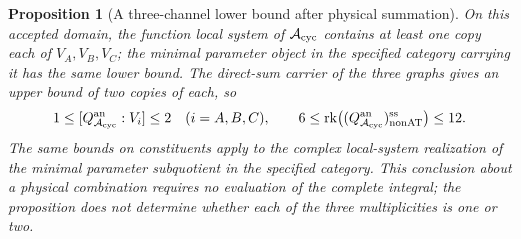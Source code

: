 \documentclass[11pt,a4paper,oneside]{article}
\theoremstyle{plain}
\newtheorem{proposition}[theorem]{Proposition}
\theoremstyle{definition}
\theoremstyle{remark}
\numberwithin{equation}{section}
\begin{document}
\begin{proposition}[A three-channel lower bound after physical summation]\label{unified:prop:cyclicice}
On this accepted domain, the function local system of $\mathcal A_{\rm cyc}$ contains at least
one copy each of $V_A,V_B,V_C$; the minimal parameter object in the specified category carrying it has the same lower bound.
The direct-sum carrier of the three graphs gives an upper bound of two copies of each, so
\[
 1\leq[Q_{\mathcal A_{\rm cyc}}^{\rm an}:V_i]\leq2\quad(i=A,B,C),
 \qquad
 6\leq\operatorname{rk}\bigl((Q_{\mathcal A_{\rm cyc}}^{\rm an})_{\rm nonAT}^{\rm ss}\bigr)
      \leq12.
\]
The same bounds on constituents apply to the complex local-system realization of the minimal parameter subquotient in the specified category.
This conclusion about a physical combination requires no evaluation of the complete integral; the proposition does not determine whether each of the three multiplicities is one or two.
\end{proposition}
\end{document}
